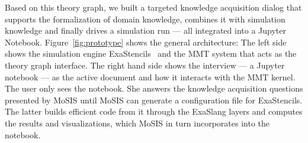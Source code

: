 Based on this theory graph, we built a targeted knowledge acquisition dialog that supports the formalization of domain knowledge, combines it with simulation knowledge and finally drives a simulation run --- all integrated into a Jupyter Notebook.
Figure~\ref{fig:prototype} shows the general architecture:
The left side shows the simulation engine \textsf{ExaStencils}~\cite{exastencils.on} and the MMT system that acts as the theory graph interface.
The right hand side shows the interview --- a Jupyter notebook --- as the active document and how it interacts with the MMT kernel.
The user only sees the notebook.
She answers the knowledge acquisition questions presented by MoSIS until MoSIS can generate a configuration file for ExaStencils.
The latter builds efficient code from it through the ExaSlang layers and computes the results and visualizations, which MoSIS in turn incorporates into the notebook. 


